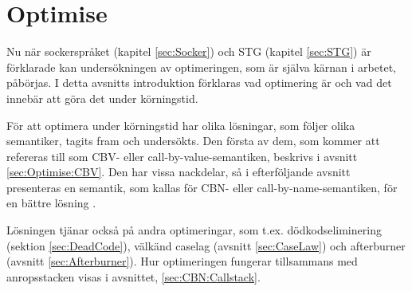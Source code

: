 \documentclass[Rapport]{subfiles}
\begin{document}
\chapter{Optimise}
\label{sec:Optimise}


\overviewOptimise

Nu när sockerspråket (kapitel \ref{sec:Socker}) och STG (kapitel \ref{sec:STG}) är förklarade
kan undersökningen av optimeringen, som är själva kärnan i arbetet, påbörjas.
I detta avsnitts introduktion förklaras vad optimering är och 
vad det innebär att göra det under körningstid. 

För att optimera under körningstid har olika lösningar, som följer olika semantiker, tagits fram och undersökts.   
Den första av dem, som kommer att refereras till som CBV- eller call-by-value-semantiken, 
beskrivs i avsnitt \ref{sec:Optimise:CBV}. Den har vissa nackdelar, så i 
efterföljande avsnitt presenteras en semantik, som kallas för CBN- eller call-by-name-semantiken, för en bättre lösning .

Lösningen tjänar också på andra optimeringar, som t.ex.
dödkodseliminering (sektion \ref{sec:DeadCode}), 
välkänd caselag (avsnitt \ref{sec:CaseLaw}) och 
afterburner (avsnitt \ref{sec:Afterburner}).
Hur optimeringen fungerar tillsammans med anropsstacken visas i avsnittet, \ref{sec:CBN:Callstack}.


\end{document}
